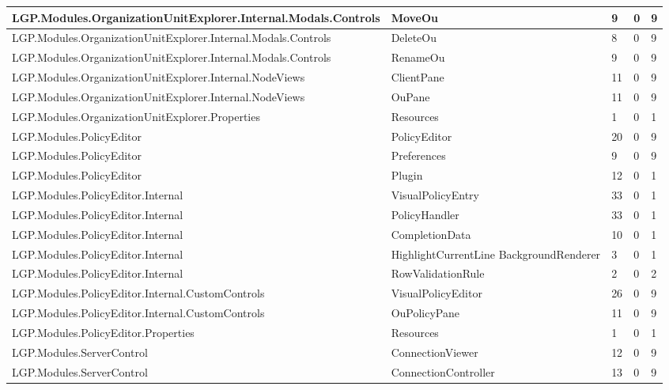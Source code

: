 \begin{table}[h!t]
{\begin{tabular}{ | p{82mm} | p{33mm} | p{10mm} | p{10mm} | p{10mm}  | }
				LGP.Modules.OrganizationUnitExplorer.Internal.Modals.Controls & MoveOu & 9     & 0     & 9  \\ \hline
				LGP.Modules.OrganizationUnitExplorer.Internal.Modals.Controls & DeleteOu & 8     & 0     & 9  \\ \hline
				LGP.Modules.OrganizationUnitExplorer.Internal.Modals.Controls & RenameOu & 9     & 0     & 9  \\ \hline
				LGP.Modules.OrganizationUnitExplorer.Internal.NodeViews & ClientPane & 11    & 0     & 9  \\ \hline
				LGP.Modules.OrganizationUnitExplorer.Internal.NodeViews & OuPane & 11    & 0     & 9  \\ \hline
				LGP.Modules.OrganizationUnitExplorer.Properties & Resources & 1     & 0     & 1  \\ \hline
				LGP.Modules.PolicyEditor & PolicyEditor & \cellcolor{ored}20    & 0     & 9  \\ \hline
				LGP.Modules.PolicyEditor & Preferences & 9     & 0     & 9  \\ \hline
				LGP.Modules.PolicyEditor & Plugin & 12    & 0     & 1  \\ \hline
				LGP.Modules.PolicyEditor.Internal & VisualPolicyEntry & \cellcolor{ored}33    & 0     & 1  \\ \hline
				LGP.Modules.PolicyEditor.Internal & PolicyHandler & \cellcolor{ored}33    & 0     & 1  \\ \hline
				LGP.Modules.PolicyEditor.Internal & CompletionData & 10    & 0     & 1  \\ \hline
				LGP.Modules.PolicyEditor.Internal & HighlightCurrentLine\newline
													BackgroundRenderer & 3     & 0     & 1  \\ \hline
				LGP.Modules.PolicyEditor.Internal & RowValidationRule & 2     & 0     & 2  \\ \hline
				LGP.Modules.PolicyEditor.Internal.CustomControls & VisualPolicyEditor & \cellcolor{ored}26    & 0     & 9  \\ \hline
				LGP.Modules.PolicyEditor.Internal.CustomControls & OuPolicyPane & 11    & 0     & 9  \\ \hline
				LGP.Modules.PolicyEditor.Properties & Resources & 1     & 0     & 1  \\ \hline
				LGP.Modules.ServerControl & ConnectionViewer & 12    & 0     & 9  \\ \hline
				LGP.Modules.ServerControl & ConnectionController & 13    & 0     & 9  \\ \hline

\end{tabular}}
\end{table}
